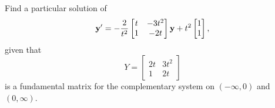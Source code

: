 \documentclass{ximera}
\begin{document}
\begin{example}\label{example:10.7.3}
Find a particular solution of
\begin{equation} \label{eq:10.7.7}
{\bf y}'=-\frac{2}{t^2}\begin{bmatrix}t&-3t^2\\1&-2t\end{bmatrix}{\bf y}
+t^2\begin{bmatrix}1\\1\end{bmatrix},
\end{equation}
given that
$$
Y=\begin{bmatrix}2t&3t^2\\1&2t\end{bmatrix}
$$
is a fundamental matrix for the complementary system on $(-\infty,0)$
and $(0,\infty)$.


\end{example}
\end{document}
